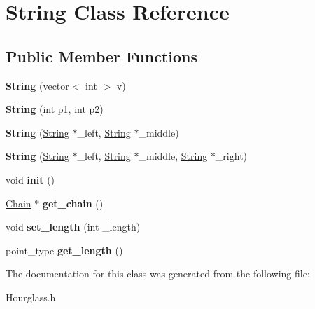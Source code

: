 \hypertarget{class_string}{}\section{String Class Reference}
\label{class_string}
\subsection*{Public Member Functions}
\begin{DoxyCompactItemize}
\item 
\mbox{\label{class_string_a7e0222531ea056a3107818eaac32bbfb}} 
{\bfseries String} (vector$<$ int $>$ v)
\item 
\mbox{\label{class_string_a8f6845278ec5be98c977e63581cc3396}} 
{\bfseries String} (int p1, int p2)
\item 
\mbox{\label{class_string_a51ce931c06a3428250fee952926e87b5}} 
{\bfseries String} (\mbox{\hyperlink{class_string}{String}} $\ast$\+\_\+left, \mbox{\hyperlink{class_string}{String}} $\ast$\+\_\+middle)
\item 
\mbox{\label{class_string_ab7eeac3a57007719de31527043140ec7}} 
{\bfseries String} (\mbox{\hyperlink{class_string}{String}} $\ast$\+\_\+left, \mbox{\hyperlink{class_string}{String}} $\ast$\+\_\+middle, \mbox{\hyperlink{class_string}{String}} $\ast$\+\_\+right)
\item 
\mbox{\label{class_string_a5a820b6931b3387f184b8d377db3c547}} 
void {\bfseries init} ()
\item 
\mbox{\label{class_string_a75fca9ba2b1394ca98cc131817e1956f}} 
\mbox{\hyperlink{class_chain}{Chain}} $\ast$ {\bfseries get\+\_\+chain} ()
\item 
\mbox{\label{class_string_a4d3ce7d9491fff2a1b99327d1351bf32}} 
void {\bfseries set\+\_\+length} (int \+\_\+length)
\item 
\mbox{\label{class_string_af3c1e35fae42859aa731fcbe595d8abf}} 
point\+\_\+type {\bfseries get\+\_\+length} ()
\end{DoxyCompactItemize}


The documentation for this class was generated from the following file\+:\begin{DoxyCompactItemize}
\item 
Hourglass.\+h\end{DoxyCompactItemize}
